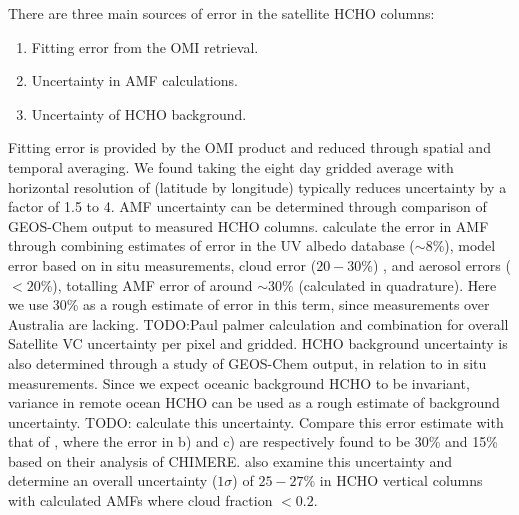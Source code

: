     There are three main sources of error in the satellite HCHO columns:
    \begin{enumerate}
      \item Fitting error from the OMI retrieval.
      \item Uncertainty in AMF calculations.
      \item Uncertainty of HCHO background.
    \end{enumerate}
    Fitting error is provided by the OMI product and reduced through spatial and temporal averaging.
    We found taking the eight day gridded average with horizontal resolution of \highhr (latitude by longitude) typically reduces uncertainty by a factor of 1.5 to 4.
    AMF uncertainty can be determined through comparison of GEOS-Chem output to measured HCHO columns.
    \textcite{Palmer2006} calculate the error in AMF through combining estimates of error in the UV albedo database ($\sim 8$\%), model error based on in situ measurements, cloud error  ($20-30$\%) \parencite{Martin2003}, and aerosol errors ($<20$\%), totalling AMF error of around $\sim 30$\% (calculated in quadrature).
    Here we use 30\% as a rough estimate of error in this term, since measurements over Australia are lacking.
    TODO:Paul palmer calculation and combination for overall Satellite VC uncertainty per pixel and gridded.
    HCHO background uncertainty is also determined through a study of GEOS-Chem output, in relation to in situ measurements. 
    Since we expect oceanic background HCHO to be invariant, variance in remote ocean HCHO can be used as a rough estimate of background uncertainty.
    TODO: calculate this uncertainty.
    Compare this error estimate with that of \textcite{Curci2010}, where the error in b) and c) are respectively found to be 30\% and 15\% based on their analysis of CHIMERE.
    \textcite{Millet2008} also examine this uncertainty and determine an overall uncertainty ($1\sigma$) of $25-27\%$ in HCHO vertical columns with calculated AMFs where cloud fraction $< 0.2$.
    
